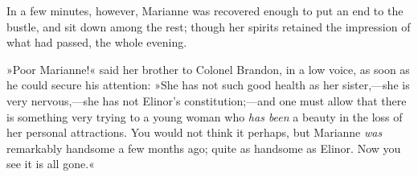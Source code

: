 In a few minutes, however, Marianne was recovered enough to put an end to the bustle, and sit down among the rest; though her spirits retained the impression of what had passed, the whole evening.

»Poor Marianne!« said her brother to Colonel Brandon, in a low voice, as soon as he could secure his attention: »She has not such good health as her sister,—she is very nervous,—she has not Elinor’s constitution;—and one must allow that there is something very trying to a young woman who \textit{has been} a beauty in the loss of her personal attractions. You would not think it perhaps, but Marianne \textit{was} remarkably handsome a few months ago; quite as handsome as Elinor. Now you see it is all gone.«